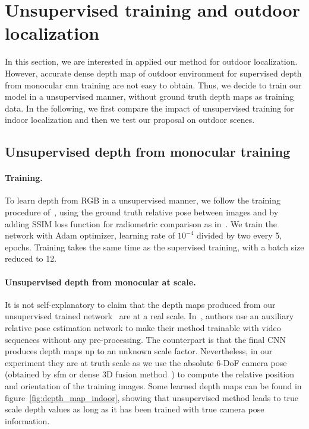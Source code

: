 \section{Unsupervised training and outdoor localization}

In this section, we are interested in applied our method for outdoor localization. However, accurate dense depth map of outdoor environment for supervised depth from monocular \ac{cnn} training are not easy to obtain. Thus, we decide to train our model in a unsupervised manner, \ie without ground truth depth maps as training data. In the following, we first compare the impact of unsupervised training for indoor localization and then we test our proposal on outdoor scenes.

\label{subseq:outdoor}
\subsection{Unsupervised depth from monocular training}
\paragraph{Training.} To learn depth from RGB in a unsupervised manner, we follow the training procedure of~\citep{Zhou2017a}, using the ground truth relative pose between images and by adding SSIM loss function for radiometric comparison as in~\citep{Mahjourian2018}. We train the network with Adam optimizer, learning rate of $10^{-4}$ divided by two every 5, epochs. Training takes the same time as the supervised training, with a batch size reduced to 12.

\paragraph{Unsupervised depth from monocular at scale.} It is not self-explanatory to claim that the depth maps produced from our unsupervised trained network~\citep{Zhou2017a} are at a real scale.  In~\citep{Zhou2017a}, authors use an auxiliary relative pose estimation network to make their method trainable with video sequences without any pre-processing. The counterpart is that the final CNN produces depth maps up to an unknown scale factor. Nevertheless, in our experiment they are at truth scale as we use the absolute 6-DoF camera pose (obtained by \ac{sfm} or dense 3D fusion method~\citep{Whelan2015}) to compute the relative position and orientation of the training images. Some learned depth maps can be found in figure~\ref{fig:depth_map_indoor}, showing that unsupervised method leads to true scale depth values as long as it has been trained with true camera pose information.

